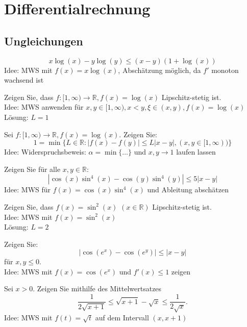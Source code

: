 \section{Differentialrechnung}
\subsection{Ungleichungen}
\begin{displaymath}
  x \log(x) - y \log(y) \leq (x - y)(1 + \log(x))
\end{displaymath}
Idee: MWS mit $f(x) = x \log(x)$, Abschätzung möglich, da $f'$ monoton wachsend ist

Zeigen Sie, dass $f : [1, \infty) \to \mathbb{R}, f(x) = \log(x)$ Lipschitz-stetig ist.\\
Idee: MWS anwenden für $x, y \in [1, \infty), x < y, \xi \in (x,y), f(x) = \log(x)$\\
Lösung: $L = 1$

Sei $f:[1, \infty) \to \mathbb{R}, f(x) = \log(x)$.
Zeigen Sie:
\begin{displaymath}
  1 = \min\{L \in \mathbb{R}: |f(x) - f(y)| \leq L|x-y|, (x,y \in [1,\infty))\}
\end{displaymath}
Idee: Widerspruchsbeweis: $\alpha = \min\{\dots\}$ und $x,y \to 1$ laufen lassen

Zeigen Sie für alle $x,y \in \mathbb{R}$:
\begin{displaymath}
  |\cos(x)\sin^4(x) - \cos(y)\sin^4(y)| \leq 5|x-y|
\end{displaymath}
Idee: MWS für $f(x) = \cos(x)\sin^4(x)$ und Ableitung abschätzen

Zeigen Sie, dass $f(x) = \sin^2(x)$ $(x \in \mathbb{R})$ Lipschitz-stetig ist.\\
Idee: MWS mit $f(x) = \sin^2(x)$\\
Lösung: $L = 2$

Zeigen Sie:
\begin{displaymath}
  |\cos(e^x) - \cos(e^y)| \leq |x-y|
\end{displaymath}
für $x,y \leq 0$.\\
Idee: MWS mit $f(x) = \cos(e^x)$ und $f'(x) \leq 1$ zeigen

Sei $x > 0$.
Zeigen Sie mithilfe des Mittelwertsatzes
\begin{displaymath}
  \frac{1}{2\sqrt{x + 1}} \leq \sqrt{x + 1} - \sqrt{x} \leq \frac{1}{2\sqrt{x}}.
\end{displaymath}
Idee: MWS mit $f(t) = \sqrt{t}$ auf dem Intervall $(x, x+1)$

